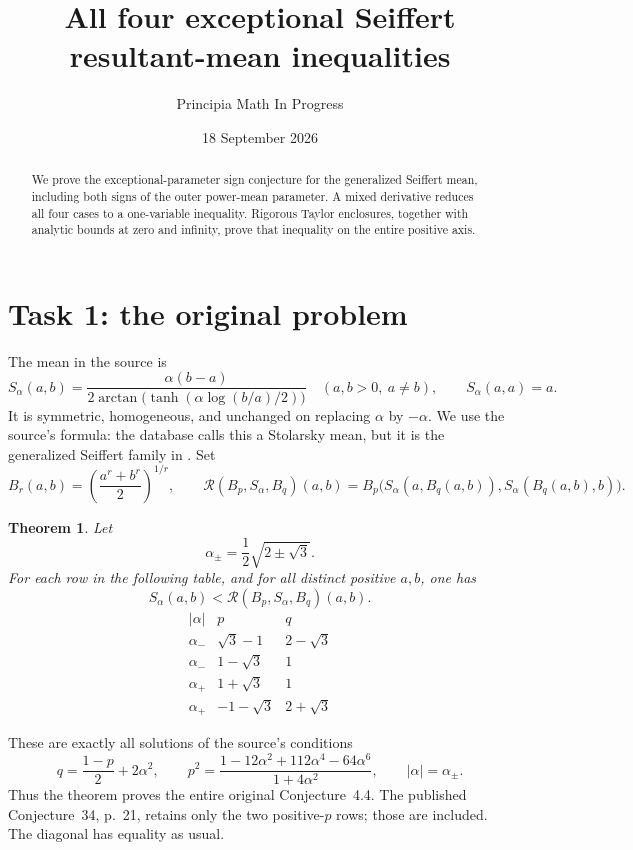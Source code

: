 \documentclass[11pt]{article}
\title{All four exceptional Seiffert resultant-mean inequalities}
\author{Principia Math In Progress}
\date{18 September 2026}
\newtheorem{theorem}{Theorem}
\newcommand{\R}{\mathcal R}
\begin{document}
\maketitle
\begin{abstract}
We prove the exceptional-parameter sign conjecture for the generalized
Seiffert mean, including both signs of the outer power-mean parameter.
A mixed derivative reduces all four cases to a one-variable inequality.
Rigorous Taylor enclosures, together with analytic bounds at zero and
infinity, prove that inequality on the entire positive axis.
\end{abstract}

\section*{Task 1: the original problem}
The mean in the source is
\[
 S_\alpha(a,b)=
 \frac{\alpha(b-a)}
 {2\arctan\!\bigl(\tanh(\alpha\log(b/a)/2)\bigr)}
 \quad(a,b>0,\ a\ne b),\qquad S_\alpha(a,a)=a.
\]
It is symmetric, homogeneous, and unchanged on replacing \(\alpha\)
by \(-\alpha\). We use the source's formula: the database calls this
a Stolarsky mean, but it is the generalized Seiffert family in
\cite[Eq.~(1.4)]{MR}.
Set
\[
 B_r(a,b)=\left(\frac{a^r+b^r}{2}\right)^{1/r},\qquad
 \R(B_p,S_\alpha,B_q)(a,b)
 =B_p\bigl(S_\alpha(a,B_q(a,b)),S_\alpha(B_q(a,b),b)\bigr).
\]

\begin{theorem}\label{main}
Let
\[
 \alpha_\pm=\frac12\sqrt{2\pm\sqrt3}.
\]
For each row in the following table, and for all distinct positive
\(a,b\), one has
\[
 S_\alpha(a,b)<\R(B_p,S_\alpha,B_q)(a,b).
\]
\[
\begin{array}{c|c|c}
 |\alpha|&p&q\\ \hline
 \alpha_-&\sqrt3-1&2-\sqrt3\\
 \alpha_-&1-\sqrt3&1\\
 \alpha_+&1+\sqrt3&1\\
 \alpha_+&-1-\sqrt3&2+\sqrt3
\end{array}
\]
\end{theorem}
These are exactly all solutions of the source's conditions
\[
 q=\frac{1-p}{2}+2\alpha^2,\qquad
 p^2=\frac{1-12\alpha^2+112\alpha^4-64\alpha^6}{1+4\alpha^2},
 \qquad |\alpha|=\alpha_\pm.
\]
Thus the theorem proves the entire original Conjecture~4.4.
The published Conjecture~34, p.~21, retains only the two positive-\(p\)
rows; those are included. The diagonal has equality as usual.
\end{document}
